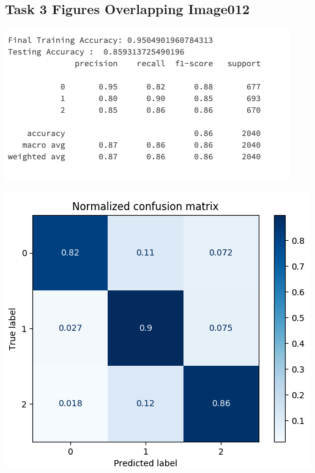 \documentclass[12pt]{article}
\begin{document}
\begin{multicols*}{2}
  \subsection{Task 3 Figures Overlapping Image012}
  \begin{center}
	\includegraphics[scale=0.4]{../screenshot/Overlapping/score012.png}

	\includegraphics[scale=0.4]{../screenshot/Overlapping/cf012.png}


\end{center}
\end{multicols*}
\end{document}
